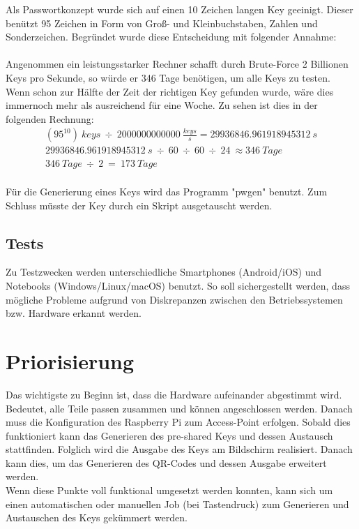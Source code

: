 \documentclass[a4paper,11pt,singlespacing]{article}
\begin{document}
		Als Passwortkonzept wurde sich auf einen 10 Zeichen langen Key geeinigt. Dieser benützt 95 Zeichen in Form von Groß- und Kleinbuchstaben, Zahlen und Sonderzeichen. Begründet wurde diese Entscheidung mit folgender Annahme: \\\\
		Angenommen ein leistungsstarker Rechner schafft durch Brute-Force 2 Billionen Keys pro Sekunde, so würde er 346 Tage benötigen, um alle Keys zu testen.  Wenn schon zur Hälfte der Zeit der richtigen Key gefunden wurde, wäre dies immernoch mehr als ausreichend für eine Woche. Zu sehen ist dies in der folgenden Rechnung:
		\begin{eqnarray}
			(95^{10})\ keys\ \div\ 2000000000000\ \frac{keys}{s} =  29936846.961918945312\ s\\
			29936846.961918945312\ s\ \div\ 60\ \div\ 60\ \div\ 24\ \approx 346 \ Tage\\
			346\ Tage\ \div\ 2\ =\ 173\ Tage
		\end{eqnarray}\\
	    Für die Generierung eines Keys wird das Programm "pwgen" benutzt.
		Zum Schluss müsste der Key durch ein Skript ausgetauscht werden.\\
	
		\subsection{Tests}
		Zu Testzwecken werden unterschiedliche Smartphones (Android/iOS) und Notebooks (Windows/Linux/macOS) benutzt. So soll sichergestellt werden, dass mögliche Probleme aufgrund von Diskrepanzen zwischen den Betriebssystemen bzw. Hardware erkannt werden.
	
	\section{Priorisierung}
	
	Das wichtigste zu Beginn ist, dass die Hardware aufeinander abgestimmt wird. Bedeutet, alle Teile passen zusammen und können angeschlossen werden.
	Danach muss die Konfiguration des Raspberry Pi zum Access-Point erfolgen. Sobald dies funktioniert kann das Generieren des pre-shared Keys und dessen Austausch stattfinden. Folglich wird die Ausgabe des Keys am Bildschirm realisiert. Danach kann dies, um das Generieren des QR-Codes und dessen Ausgabe erweitert werden.\\
	Wenn diese Punkte voll funktional umgesetzt werden konnten, kann sich um einen automatischen oder manuellen Job (bei Tastendruck) zum Generieren und Austauschen des Keys gekümmert werden.
		
\end{document}
